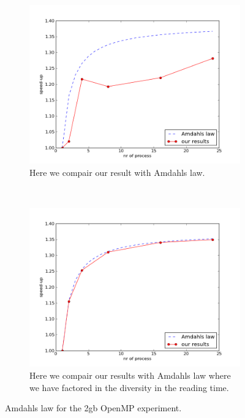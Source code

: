 \documentclass[a4paper,10pt]{article}
\begin{document}
\begin{figure}[h!t]
        \centering
        \begin{subfigure}[b]{0.70\textwidth}
                \centering
                \includegraphics[width=\textwidth]{graphics/mpio2gb_take2/Amdahls_law.png}
                \caption{Here we compair our result with Amdahls law.}
                \label{fig:mpio2_amad1}
        \end{subfigure}%
        \\
        \begin{subfigure}[b]{0.70\textwidth}
                \centering
                \includegraphics[width=\textwidth]{graphics/mpio2gb_take2/Amdahls_law2.png}
                \caption{Here we compair our results with Amdahls law where we have factored in
                         the diversity in the reading time.}
                \label{fig:mpio2_amad2}
        \end{subfigure}
        \caption{Amdahls law for the 2gb OpenMP experiment.}
\end{figure}
\end{document}
